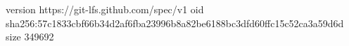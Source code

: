 version https://git-lfs.github.com/spec/v1
oid sha256:57c1833cbf66b34d2af6fba23996b8a82be6188bc3dfd60ffc15c52ca3a59d6d
size 349692
